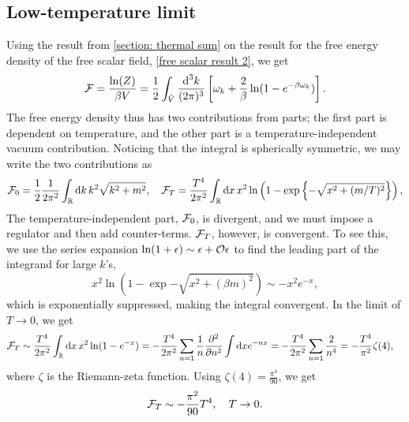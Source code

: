 \subsection{Low-temperature limit}

Using the result from \autoref{section: thermal sum} on the result for the free energy density of the free scalar field, \autoref{free scalar result 2}, we get
\begin{equation}
    \label{free scalar free enrgy}
    \mathcal{F} = \frac{\ln(Z)}{\beta V}
    = \frac{1}{2} \int_{\tilde V} \frac{\text{d}^3 k}{(2 \pi)^3}
    \left[
        \omega_k + \frac{2}{\beta }\ln(1 - e^{-\beta\omega_k})
    \right].
\end{equation}
The free energy density thus has two contributions from parts; the first part is dependent on temperature, and the other part is a temperature-independent vacuum contribution.
Noticing that the integral is spherically symmetric, we may write the two contributions as
%
\begin{equation}
    \mathcal{F}_0 = \frac{1}{2} \frac{1}{2 \pi^2}\int_{\mathbb{R}} \text{d} k \, k^2 \sqrt{k^2 + m^2}, \quad
    \mathcal{F}_T = \frac{T^4}{2 \pi^2}\int_{\mathbb{R}} \text{d} x \, x^2  
    \ln\left(1 - \text{exp} \left\{ -\sqrt{x^2 + (m/T)^2} \right\}\right), 
\end{equation}
%
The temperature-independent part, $\mathcal{F}_0$, is divergent, and we must impose a regulator and then add counter-terms.
$\mathcal{F}_T$, however, is convergent. 
To see this, we use the series expansion $\ln(1 + \epsilon) \sim \epsilon + \mathcal O{\epsilon}$ to find the leading part of the integrand for large $k$'s, 
%
\begin{equation}
    x^2 \ln\left(1 - \exp{-\sqrt{x^2 + (\beta m)^2}}\right) \sim - x^2 e^{-x}, 
\end{equation}
%
which is exponentially suppressed, making the integral convergent.
In the limit of $T \rightarrow 0$, we get
%
\begin{align}
    \nonumber
    \mathcal{F}_T & \sim 
    \frac{T^4}{2 \pi^2} \int_{\mathbb{R}} \text{d} x \, x^2 \ln(1 - e^{-x})
    = - \frac{T^4}{2 \pi^2} \sum_{n=1} \frac{1}{n} \pdv[2]{}{n} \int \text{d} x e^{-nx}
    = - \frac{T^4}{2 \pi^2} \sum_{n=1} \frac{2}{n^4}
    = - \frac{T^4}{\pi^2} \zeta(4),
\end{align}
%
where $\zeta$ is the Riemann-zeta function.
Using $\zeta(4) = \frac{\pi^4}{90}$, we get
%
\begin{equation}
    \mathcal{F}_T \sim - \frac{\pi^2}{90} T^4, \quad T \rightarrow 0.
\end{equation}




